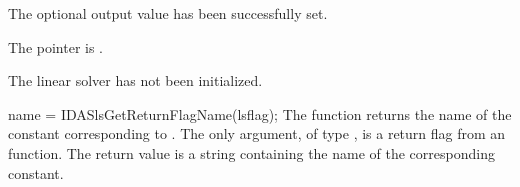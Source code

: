 {{\begin{args}
    The optional output value has been successfully set.
  \item[\Id{IDASLS\_MEM\_NULL}]
    The  pointer is .
  \item[\Id{IDASLS\_LMEM\_NULL}]
    The {\idasls} linear solver has not been initialized.
  \end{args}
}
{
}
{
  name = IDASlsGetReturnFlagName(lsflag);
}
{
  The function  returns the
  name of the {\idasls} constant corresponding to .
}
{
  The only argument, of type , is a return flag from an {\idasls} function.
}
{
  The return value is a string containing the name of the corresponding constant.
}
{}

%
%
}
